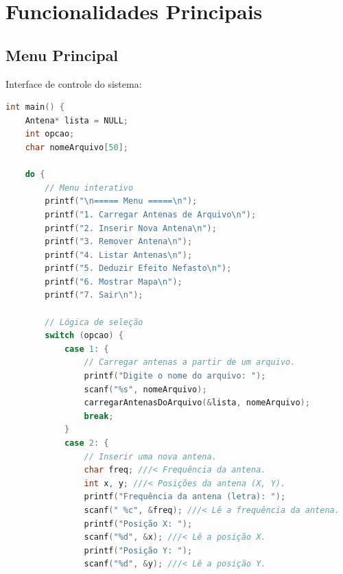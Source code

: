 \documentclass[a4paper, 12pt]{article}
\begin{document}
\section{Funcionalidades Principais}

\subsection{Menu Principal}
Interface de controle do sistema:

\begin{lstlisting}[language=C]
int main() {
    Antena* lista = NULL;
    int opcao;
    char nomeArquivo[50];

    do {
        // Menu interativo
        printf("\n===== Menu =====\n");
        printf("1. Carregar Antenas de Arquivo\n");
        printf("2. Inserir Nova Antena\n");
        printf("3. Remover Antena\n");
        printf("4. Listar Antenas\n");
        printf("5. Deduzir Efeito Nefasto\n");
        printf("6. Mostrar Mapa\n");
        printf("7. Sair\n");
        
        // Lógica de seleção
        switch (opcao) {
            case 1: {
                // Carregar antenas a partir de um arquivo.
                printf("Digite o nome do arquivo: ");
                scanf("%s", nomeArquivo);
                carregarAntenasDoArquivo(&lista, nomeArquivo);
                break;
            }
            case 2: {
                // Inserir uma nova antena.
                char freq; ///< Frequência da antena.
                int x, y; ///< Posições da antena (X, Y).
                printf("Frequência da antena (letra): ");
                scanf(" %c", &freq); ///< Lê a frequência da antena.
                printf("Posição X: ");
                scanf("%d", &x); ///< Lê a posição X.
                printf("Posição Y: ");
                scanf("%d", &y); ///< Lê a posição Y.


\end{lstlisting}
\end{document}
